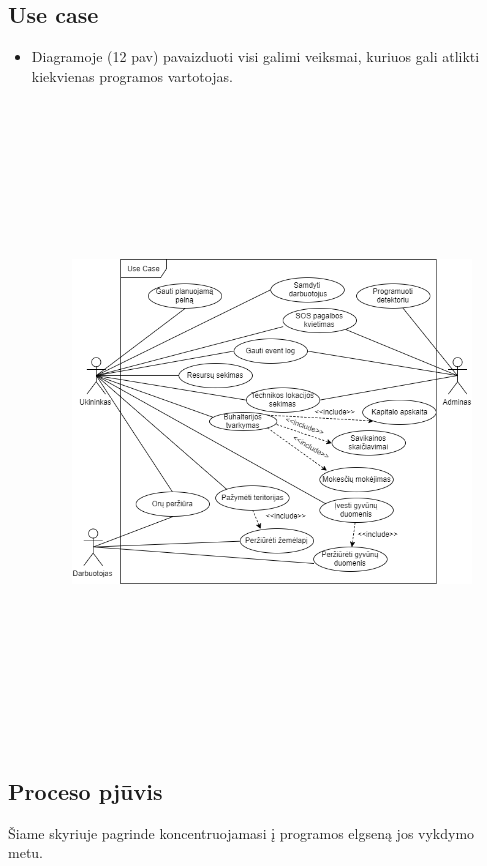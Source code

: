 \documentclass[oneside]{VUMIFPSkursinis}
\begin{document}
\subsection{Use case}
\begin{itemize}
\item Diagramoje (12 pav) pavaizduoti visi galimi veiksmai, kuriuos gali atlikti kiekvienas programos vartotojas.
		\begin{figure}[H]
		\centering	
	\includegraphics[width=15cm,height=17cm,keepaspectratio]{UseCaseFull.png}
	\caption{}
	\label{fig:UseCaseFull}
\end{figure}
\end{itemize}
\subsection{Proceso pjūvis}
Šiame skyriuje pagrinde koncentruojamasi į programos elgseną jos vykdymo metu.
\end{document}
